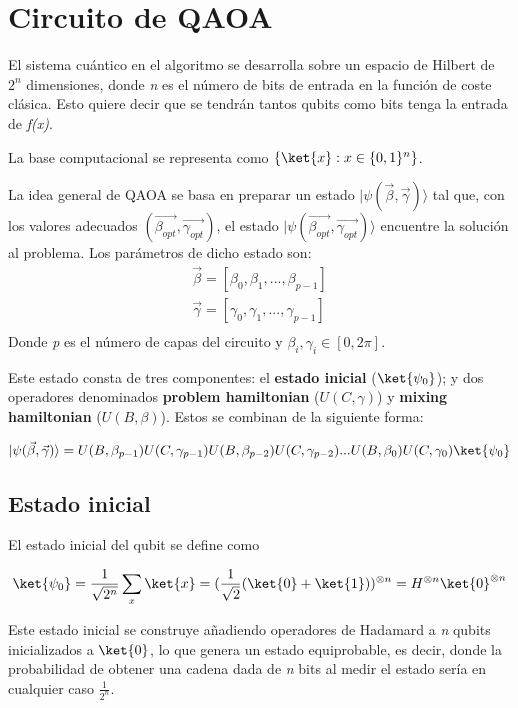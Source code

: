 \section{Circuito de QAOA}
\label{sec:3-circuito de qaoa}
El sistema cuántico en el algoritmo se desarrolla sobre un espacio de Hilbert de $2^n$ dimensiones, donde \textit{n} es el número de bits de entrada en la función de coste clásica. Esto quiere decir que se tendrán tantos qubits como bits tenga la entrada de \textit{f(x)}.

La base computacional se representa como $\{\ket{x} : x \in \{0, 1\}^n\}$.

La idea general de QAOA se basa en preparar un estado \(\lvert \psi(\vec{\beta}, \vec{\gamma})\rangle\) tal que, con los valores adecuados \( (\vec{\beta_{opt}}, \vec{\gamma_{opt}}) \), el estado \(\lvert\psi(\vec{\beta_{opt}}, \vec{\gamma_{opt}})\rangle\) encuentre la solución al problema. Los parámetros de dicho estado son:
\begin{align*}
  \vec{\beta} = [\beta_0, \beta_1, ..., \beta_{p-1}] \\
  \vec{\gamma} = [\gamma_0, \gamma_1, ..., \gamma_{p-1}] \\
\end{align*}
Donde \textit{p} es el número de capas del circuito y $\beta_i, \gamma_i \in{[0, 2\pi]}$.

Este estado consta de tres componentes: el \textbf{estado inicial} ($\ket{\psi_0}$); y dos operadores denominados \textbf{problem hamiltonian} ($U(C, \gamma)$) y \textbf{mixing hamiltonian} ($U(B, \beta)$).
Estos se combinan de la siguiente forma:

\[
  \lvert\psi(\vec{\beta}, \vec{\gamma})\rangle = U(B, \beta_{p-1})U(C, \gamma_{p-1})U(B, \beta_{p-2})U(C, \gamma_{p-2}) ... U(B, \beta_0)U(C, \gamma_0) \ket{\psi_0}
\]

\subsection{Estado inicial}
El estado inicial del qubit se define como

\begin{align*}
  \ket{\psi_0} = \frac{1}{\sqrt{2^n}} \sum_x\ket{x}
  = (\frac{1}{\sqrt{2}} (\ket{0} + \ket{1}))^{\otimes n}
  = H^{\otimes n} \ket{0}^{\otimes n}
\end{align*}

Este estado inicial se construye añadiendo operadores de Hadamard a \textit{n} qubits inicializados a $\ket{0}$, lo que genera un estado equiprobable, es decir, donde la probabilidad de obtener una cadena dada de \textit{n} bits al medir el estado sería en cualquier caso $\frac{1}{2^n}$.

